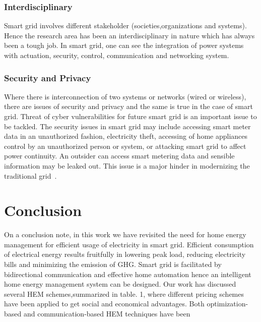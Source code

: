 \documentclass[journal]{IEEEtran}
\begin{document}
\subsubsection{Interdisciplinary}
Smart grid involves different stakeholder (societies,organizations and systems). Hence the research area has been an interdisciplinary in nature which has always been a tough job. In smart grid, one can see the integration of power systems with actuation, security, control, communication and networking system.\\
\subsubsection{Security and Privacy}
Where there is interconnection of two systems or networks (wired or wireless), there are issues of security and privacy and the same is true in the case of smart grid. Threat of cyber vulnerabilities for future smart grid is an important issue to be tackled. The security issues in smart grid may include accessing smart meter data in an unauthorized fashion, electricity theft, accessing of home appliances control by an unauthorized person or system, or attacking smart grid to affect power continuity. An outsider can access smart metering data and sensible information may be leaked out. This issue is a major hinder in modernizing the traditional grid~\cite{kailas2012survey}.

\section{Conclusion}
On a conclusion note, in this work we have revisited the need for home energy management for efficient usage of electricity in smart grid. Efficient consumption of electrical energy results fruitfully in lowering peak load, reducing electricity bills and minimizing the emission of GHG. Smart grid is facilitated by bidirectional communication and effective home automation hence an intelligent home energy management system can be designed. Our work has discussed several HEM schemes,summarized in table. 1, where different pricing schemes have been applied to get social and economical advantages. Both optimization-based and communication-based HEM techniques have been
\end{document}
